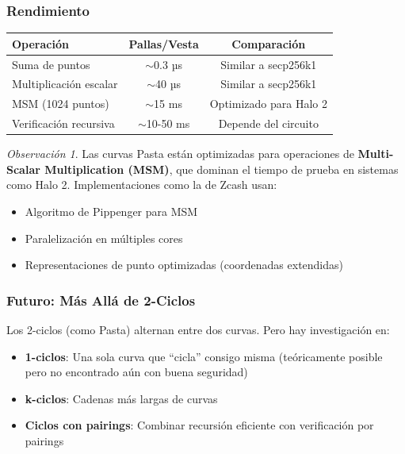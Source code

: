 \documentclass[11pt,a4paper,twoside,openright]{book}
\theoremstyle{definition}
\theoremstyle{plain}
\theoremstyle{remark}
\newtheorem{remark}{Observación}[chapter]
\begin{document}
\subsubsection{Rendimiento}

\begin{center}
\begin{tabular}{lcc}
\toprule
\textbf{Operación} & \textbf{Pallas/Vesta} & \textbf{Comparación} \\
\midrule
Suma de puntos & $\sim$0.3 µs & Similar a secp256k1 \\
Multiplicación escalar & $\sim$40 µs & Similar a secp256k1 \\
MSM (1024 puntos) & $\sim$15 ms & Optimizado para Halo 2 \\
Verificación recursiva & $\sim$10-50 ms & Depende del circuito \\
\bottomrule
\end{tabular}
\end{center}

\begin{remark}
Las curvas Pasta están optimizadas para operaciones de \textbf{Multi-Scalar Multiplication (MSM)}, que dominan el tiempo de prueba en sistemas como Halo 2. Implementaciones como la de Zcash usan:
\begin{itemize}
    \item Algoritmo de Pippenger para MSM
    \item Paralelización en múltiples cores
    \item Representaciones de punto optimizadas (coordenadas extendidas)
\end{itemize}
\end{remark}

\subsubsection{Futuro: Más Allá de 2-Ciclos}

\begin{intuicion}
Los 2-ciclos (como Pasta) alternan entre dos curvas. Pero hay investigación en:
\begin{itemize}
    \item \textbf{1-ciclos}: Una sola curva que ``cicla'' consigo misma (teóricamente posible pero no encontrado aún con buena seguridad)
    \item \textbf{k-ciclos}: Cadenas más largas de curvas
    \item \textbf{Ciclos con pairings}: Combinar recursión eficiente con verificación por pairings
\end{itemize}
\end{intuicion}
\end{document}
